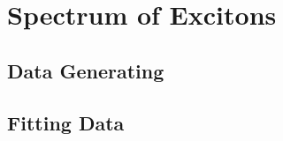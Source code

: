 
\chapter{Spectrum of Excitons}
\label{sec:excitons}

\section{Data Generating}
\section{Fitting Data}